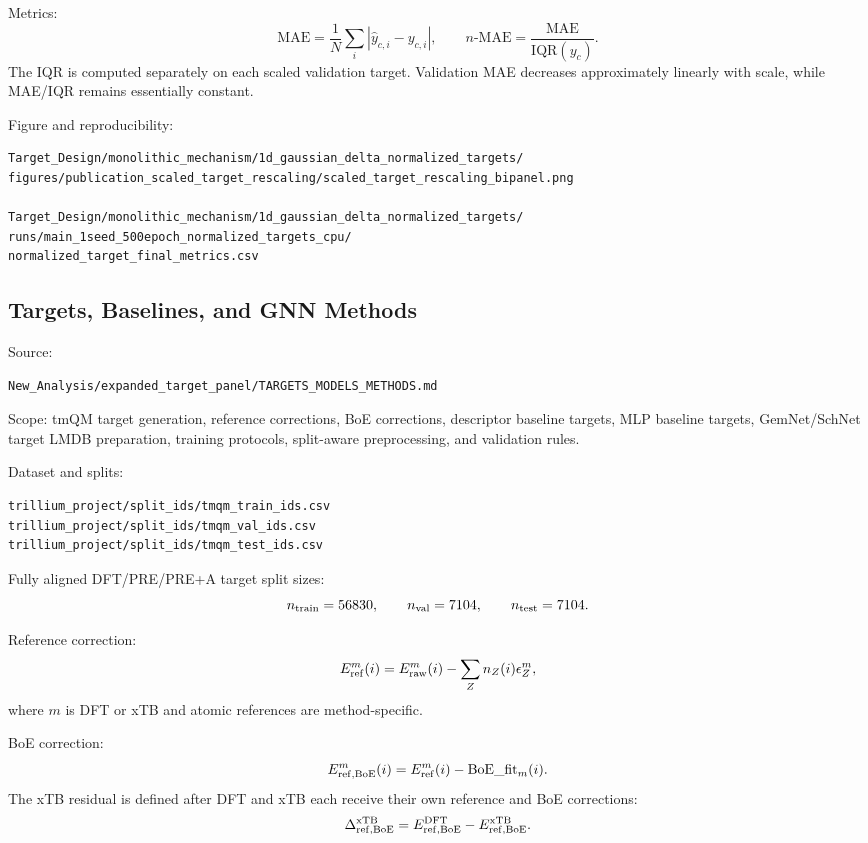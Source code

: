 Metrics:
\[
  \mathrm{MAE} = \frac{1}{N}\sum_i |\hat{y}_{c,i} - y_{c,i}|,
  \qquad
  n\text{-MAE} = \frac{\mathrm{MAE}}{\mathrm{IQR}(y_c)}.
\]
The IQR is computed separately on each scaled validation target. Validation MAE decreases approximately linearly with scale, while MAE/IQR remains essentially constant.

Figure and reproducibility:
\begin{verbatim}
Target_Design/monolithic_mechanism/1d_gaussian_delta_normalized_targets/
figures/publication_scaled_target_rescaling/scaled_target_rescaling_bipanel.png

Target_Design/monolithic_mechanism/1d_gaussian_delta_normalized_targets/
runs/main_1seed_500epoch_normalized_targets_cpu/
normalized_target_final_metrics.csv
\end{verbatim}

\subsection*{Targets, Baselines, and GNN Methods}

Source:
\begin{verbatim}
New_Analysis/expanded_target_panel/TARGETS_MODELS_METHODS.md
\end{verbatim}

Scope: tmQM target generation, reference corrections, BoE corrections, descriptor baseline targets, MLP baseline targets, GemNet/SchNet target LMDB preparation, training protocols, split-aware preprocessing, and validation rules.

Dataset and splits:
\begin{verbatim}
trillium_project/split_ids/tmqm_train_ids.csv
trillium_project/split_ids/tmqm_val_ids.csv
trillium_project/split_ids/tmqm_test_ids.csv
\end{verbatim}
Fully aligned DFT/PRE/PRE+A target split sizes:
\[
  n_{\rm train}=56830,\qquad n_{\rm val}=7104,\qquad n_{\rm test}=7104.
\]

Reference correction:
\[
  E_{\rm ref}^{m}(i)
  =
  E_{\rm raw}^{m}(i)
  -
  \sum_Z n_Z(i)\epsilon_Z^{m},
\]
where \(m\) is DFT or xTB and atomic references are method-specific.

BoE correction:
\[
  E_{\rm ref,BoE}^{m}(i)
  =
  E_{\rm ref}^{m}(i)
  -
  \mathrm{BoE\_fit}_m(i).
\]
The xTB residual is defined after DFT and xTB each receive their own reference and BoE corrections:
\[
  \Delta^{\rm xTB}_{\rm ref,BoE}
  =
  E_{\rm ref,BoE}^{\rm DFT}
  -
  E_{\rm ref,BoE}^{\rm xTB}.
\]

